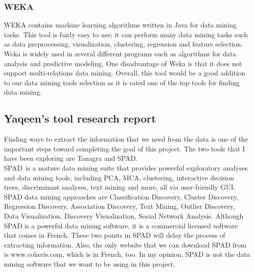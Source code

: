 \documentclass[12pt]{article}
\begin{document}
	\subsubsection{WEKA} \label{wek}
	WEKA contains machine learning algorithms written in Java for data mining tasks. This tool is fairly easy to use; it can perform many data mining tasks such as data preprocessing, visualization, clustering, regression and feature selection. Weka is widely used in several different programs such as algorithms for data analysis and predictive modeling. One disadvantage of Weka is that it does not support multi-relations data mining. Overall, this tool would be a good addition to our data mining tools selection as it is rated one of the top tools for finding data mining. 
	\subsection{Yaqeen's tool research report} \label{app_yaq}
	Finding ways to extract the information that we need from the data is one of the important steps toward completing the goal of this project. The two tools that I have been exploring are Tanagra and SPAD. \\
\hfill \break
SPAD is a mature data mining suite that provides powerful exploratory analyses and data mining tools, including PCA, MCA, clustering, interactive decision trees, discriminant analyses, text mining and more, all via user-friendly GUI. SPAD data mining approaches are Classification Discovery, Cluster Discovery, Regression Discovery, Association Discovery, Text Mining, Outlier Discovery, Data Visualization, Discovery Visualization, Social Network Analysis. Although SPAD is a powerful data mining software, it is a commercial licensed software that comes in French. These two points in SPAD will delay the process of extracting information. Also, the only website that we can download SPAD from is www.coheris.com, which is in French, too. In my opinion, SPAD is not the data mining software that we want to be using in this project. \\
\hfil \break
\end{document}

